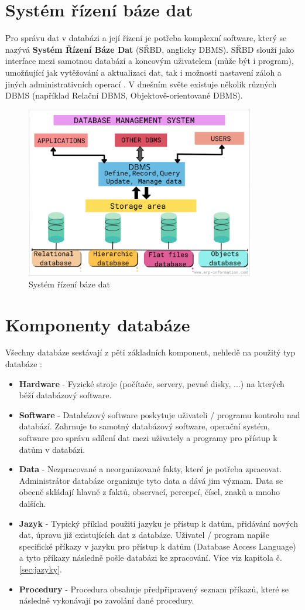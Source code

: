 \section{Systém řízení báze dat}
Pro správu dat v databázi a její řízení je potřeba komplexní software, který se nazývá \textbf{Systém Řízení Báze Dat} (SŘBD, anglicky DBMS). SŘBD slouží jako interface mezi samotnou databází a koncovým uživatelem (může být i program), umožňující jak vytěžování a aktualizaci dat, tak i možnosti nastavení záloh a jiných administrativních operací \cite{OracleDB}. V dnešním světe existuje několik různých DBMS (například Relační DBMS, Objektově-orientované DBMS).
\begin{figure}[h!]
\centering
\includegraphics[width=10cm]{img/databaze/dbms}
\caption{Systém řízení báze dat}
\label{fig:dbms}
\end{figure}

\section{Komponenty databáze}
Všechny databáze sestávají z pěti základních komponent, nehledě na použitý typ databáze \cite{TechTargetDB, guru99Database}:
\begin{itemize}
\item \textbf{Hardware} - Fyzické stroje (počítače, servery, pevné disky, ...) na kterých běží databázový software.
\item \textbf{Software} - Databázový software poskytuje uživateli / programu kontrolu nad databází. Zahrnuje to samotný databázový software, operační systém, software pro správu sdílení dat mezi uživately a programy pro přístup k datům v databázi.
\item \textbf{Data} - Nezpracované a neorganizované fakty, které je potřeba zpracovat. Administrátor databáze organizuje tyto data a dává jim význam. Data se obecně skládají hlavně z faktů, observací, percepcí, čísel, znaků a mnoho dalších.
\item \textbf{Jazyk} - Typický příklad použití jazyku je přístup k datům, přidávání nových dat, úpravu již existujících dat z databáze. Uživatel / program napíše specifické příkazy v jazyku pro přístup k datům (Database Access Language) a tyto příkazy následně pošle databázi ke zpracování. Více viz kapitola č. \ref{sec:jazyky}.
\item \textbf{Procedury} - Procedura obsahuje předpřipravený seznam příkazů, které se následně vykonávají po zavolání dané procedury. 
\end{itemize}

